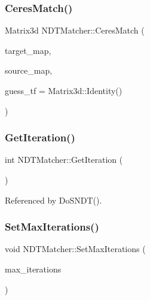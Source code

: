 \subsubsection{\texorpdfstring{Ceres\+Match()}{CeresMatch()}\hspace{0.1cm}{\footnotesize\ttfamily [2/2]}}
{\footnotesize\ttfamily Matrix3d N\+D\+T\+Matcher\+::\+Ceres\+Match (\begin{DoxyParamCaption}\item[{\hyperlink{classNDTMap}{N\+D\+T\+Map} \&}]{target\+\_\+map,  }\item[{\hyperlink{classNDTMap}{N\+D\+T\+Map} \&}]{source\+\_\+map,  }\item[{const Matrix3d \&}]{guess\+\_\+tf = {\ttfamily Matrix3d\+:\+:Identity()} }\end{DoxyParamCaption})}

\mbox{\label{classNDTMatcher_a6a24c058f4760bd7d4ac7d900afefcc0}} 
\subsubsection{\texorpdfstring{Get\+Iteration()}{GetIteration()}}
{\footnotesize\ttfamily int N\+D\+T\+Matcher\+::\+Get\+Iteration (\begin{DoxyParamCaption}{ }\end{DoxyParamCaption})\hspace{0.3cm}{\ttfamily [inline]}}



Referenced by Do\+S\+N\+D\+T().

\mbox{\label{classNDTMatcher_a3ba71599144b6716f5c52da2db904ee6}} 
\subsubsection{\texorpdfstring{Set\+Max\+Iterations()}{SetMaxIterations()}}
{\footnotesize\ttfamily void N\+D\+T\+Matcher\+::\+Set\+Max\+Iterations (\begin{DoxyParamCaption}\item[{int}]{max\+\_\+iterations }\end{DoxyParamCaption})\hspace{0.3cm}{\ttfamily [inline]}}

